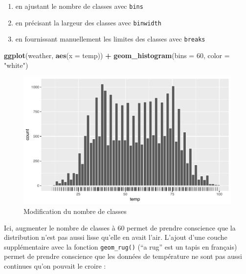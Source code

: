 \documentclass[a4paperpaper,]{article}
\newenvironment{Shaded}{\begin{snugshade}}{\end{snugshade}}
\newcommand{\KeywordTok}[1]{\textcolor[rgb]{0.13,0.29,0.53}{\textbf{#1}}}
\newcommand{\DataTypeTok}[1]{\textcolor[rgb]{0.13,0.29,0.53}{#1}}
\newcommand{\DecValTok}[1]{\textcolor[rgb]{0.00,0.00,0.81}{#1}}
\newcommand{\StringTok}[1]{\textcolor[rgb]{0.31,0.60,0.02}{#1}}
\newcommand{\OperatorTok}[1]{\textcolor[rgb]{0.81,0.36,0.00}{\textbf{#1}}}
\newcommand{\NormalTok}[1]{#1}
\providecommand{\tightlist}{%
  \setlength{\itemsep}{0pt}\setlength{\parskip}{0pt}}
\theoremstyle{definition}
\theoremstyle{definition}
\theoremstyle{definition}
\theoremstyle{remark}
\begin{document}
\begin{enumerate}
\def\labelenumi{\arabic{enumi}.}
\tightlist
\item
  en ajustant le nombre de classes avec \texttt{bins}
\item
  en précisant la largeur des classes avec \texttt{binwidth}
\item
  en fournissant manuellement les limites des classes avec
  \texttt{breaks}
\end{enumerate}

\begin{Shaded}
\begin{Highlighting}[]
\KeywordTok{ggplot}\NormalTok{(weather, }\KeywordTok{aes}\NormalTok{(}\DataTypeTok{x =}\NormalTok{ temp)) }\OperatorTok{+}
\StringTok{  }\KeywordTok{geom_histogram}\NormalTok{(}\DataTypeTok{bins =} \DecValTok{60}\NormalTok{, }\DataTypeTok{color =} \StringTok{"white"}\NormalTok{)}
\end{Highlighting}
\end{Shaded}

\begin{figure}[htpb]

{\centering \includegraphics[width=0.9\linewidth]{figure/unnamed-chunk-49-1} 

}

\caption{Modification du nombre de classes}\label{fig:unnamed-chunk-49}
\end{figure}

Ici, augmenter le nombre de classes à 60 permet de prendre conscience
que la distribution n'est pas aussi lisse qu'elle en avait l'air.
L'ajout d'une couche supplémentaire avec la fonction
\texttt{geom\_rug()} (``a rug'' est un tapis en français) permet de
prendre conscience que les données de température ne sont pas aussi
continues qu'on pouvait le croire :
\end{document}

